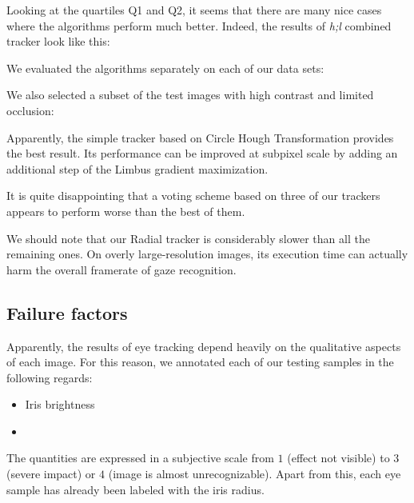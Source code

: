 Looking at the quartiles Q1 and Q2, it seems that there are many nice cases where the algorithms perform much better.
Indeed, the results of \textit{h;l} combined tracker look like this:\\

We evaluated the algorithms separately on each of our data sets:\\

We also selected a subset of the test images with high contrast and limited occlusion:\\

Apparently, the simple tracker based on Circle Hough Transformation provides the best result.
Its performance can be improved at subpixel scale by adding an additional step of the Limbus gradient maximization.

It is quite disappointing that a voting scheme based on three of our trackers appears to perform worse than the best of them.

We should note that our Radial tracker is considerably slower than all the remaining ones.
On overly large-resolution images, its execution time can actually harm the overall framerate of gaze recognition.

\subsection{Failure factors}
\label{s:results-eyecovar}

Apparently, the results of eye tracking depend heavily on the qualitative aspects of each image.
For this reason, we annotated each of our testing samples in the following regards:
\begin{itemize}
\item Iris brightness
\item {}
\end{itemize}
The quantities are expressed in a subjective scale from $1$ (effect not visible) to $3$ (severe impact) or $4$ (image is almost unrecognizable).
Apart from this, each eye sample has already been labeled with the iris radius.


